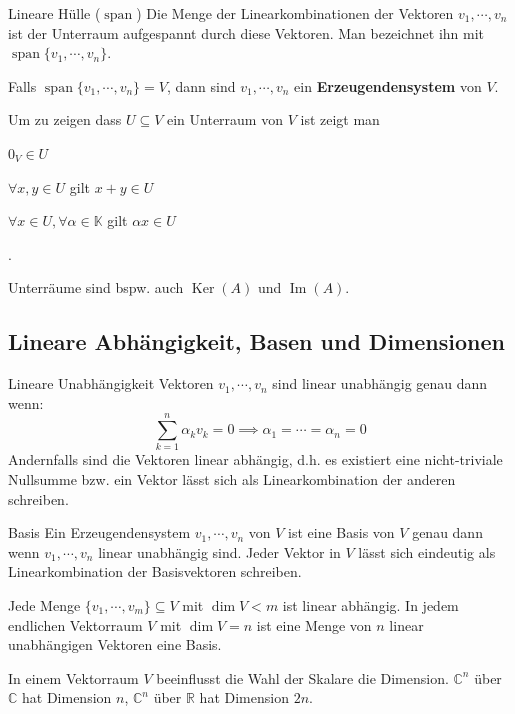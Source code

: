 \documentclass[a4paper,10pt]{article}
\DeclareMathOperator{\Image}{Im}
\DeclareMathOperator{\Kernel}{Ker}
\DeclareMathOperator{\Span}{span}
\def\R{\mathbb{R}}
\def\C{\mathbb{C}}
\def\K{\mathbb{K}}
\begin{document}
\begin{subbox}{Lineare Hülle ($\Span$)}
  Die Menge der Linearkombinationen der Vektoren $v_1, \cdots, v_n$ ist der Unterraum aufgespannt durch diese Vektoren. Man bezeichnet ihn mit $\Span \{ v_1, \cdots, v_n \}$.
\end{subbox}

Falls $\Span \{v_1, \cdots, v_n\} = V$, dann sind $v_1, \cdots, v_n$ ein \textbf{Erzeugendensystem} von $V$.

Um zu zeigen dass $U \subseteq V$ ein Unterraum von $V$ ist zeigt man 
\begin{rowlist}
  \item $0_V \in U$
  \item $\forall x, y \in U$ gilt $x + y \in U$
  \item $\forall x \in U, \forall \alpha \in \K$ gilt $\alpha x \in U$
\end{rowlist}.

Unterräume sind bspw. auch $\Kernel(A)$ und $\Image(A)$.

\subsection{Lineare Abhängigkeit, Basen und Dimensionen}

\begin{mainbox}{Lineare Unabhängigkeit}
  Vektoren $v_1, \cdots, v_n$ sind linear unabhängig genau dann wenn:
  $$\sum_{k=1}^n \alpha_k v_k = 0 \implies \alpha_1 = \cdots = \alpha_n = 0$$
  Andernfalls sind die Vektoren linear abhängig, d.h. es existiert eine nicht-triviale Nullsumme bzw. ein Vektor lässt sich als Linearkombination der anderen schreiben.
\end{mainbox}

\begin{mainbox}{Basis}
  Ein Erzeugendensystem $v_1, \cdots, v_n$ von $V$ ist eine Basis von $V$ genau dann wenn $v_1, \cdots, v_n$ linear unabhängig sind. Jeder Vektor in $V$ lässt sich eindeutig als Linearkombination der Basisvektoren schreiben.
\end{mainbox}

Jede Menge $\{v_1, \cdots, v_m\} \subseteq V$ mit $\dim V < m$ ist linear abhängig. In jedem endlichen Vektorraum $V$ mit $\dim V = n$ ist eine Menge von $n$ linear unabhängigen Vektoren eine Basis.

In einem Vektorraum $V$ beeinflusst die Wahl der Skalare die Dimension. $\C^n$ über $\C$ hat Dimension $n$, $\C^n$ über $\R$ hat Dimension $2n$.
\end{document}
